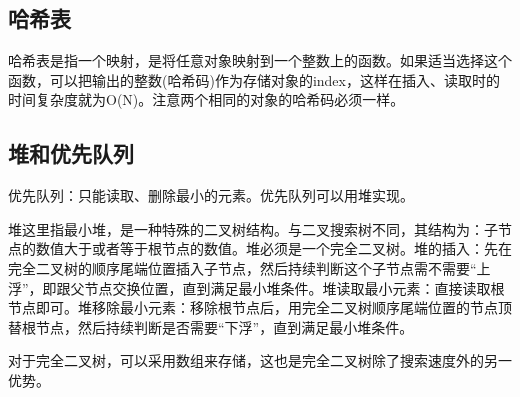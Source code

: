 \documentclass{article}
\begin{document}
	\subsection{哈希表}
	哈希表是指一个映射，是将任意对象映射到一个整数上的函数。如果适当选择这个函数，可以把输出的整数(哈希码)作为存储对象的index，这样在插入、读取时的时间复杂度就为O(N)。注意两个相同的对象的哈希码必须一样。
	\subsection{堆和优先队列}
	优先队列：只能读取、删除最小的元素。优先队列可以用堆实现。
	
	堆这里指最小堆，是一种特殊的二叉树结构。与二叉搜索树不同，其结构为：子节点的数值大于或者等于根节点的数值。堆必须是一个完全二叉树。堆的插入：先在完全二叉树的顺序尾端位置插入子节点，然后持续判断这个子节点需不需要“上浮”，即跟父节点交换位置，直到满足最小堆条件。堆读取最小元素：直接读取根节点即可。堆移除最小元素：移除根节点后，用完全二叉树顺序尾端位置的节点顶替根节点，然后持续判断是否需要“下浮”，直到满足最小堆条件。
	
	对于完全二叉树，可以采用数组来存储，这也是完全二叉树除了搜索速度外的另一优势。
\end{document}
